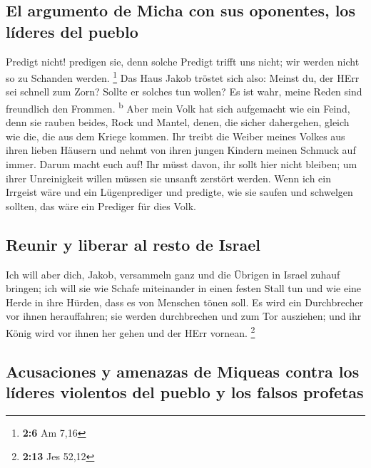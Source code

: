 \hypertarget{el-argumento-de-micha-con-sus-oponentes-los-luxedderes-del-pueblo}{%
\subsection{El argumento de Micha con sus oponentes, los líderes del
pueblo}\label{el-argumento-de-micha-con-sus-oponentes-los-luxedderes-del-pueblo}}

 Predigt nicht! predigen sie, denn solche Predigt trifft
uns nicht; wir werden nicht so zu Schanden werden. \footnote{\textbf{2:6}
  Am 7,16}  Das Haus Jakob tröstet sich also: Meinst du,
der HErr sei schnell zum Zorn? Sollte er solches tun wollen? Es ist
wahr, meine Reden sind freundlich den Frommen. \textsuperscript{b}
 Aber mein Volk hat sich aufgemacht wie ein Feind, denn
sie rauben beides, Rock und Mantel, denen, die sicher dahergehen, gleich
wie die, die aus dem Kriege kommen.  Ihr treibt die Weiber
meines Volkes aus ihren lieben Häusern und nehmt von ihren jungen
Kindern meinen Schmuck auf immer.  Darum macht euch auf!
Ihr müsst davon, ihr sollt hier nicht bleiben; um ihrer Unreinigkeit
willen müssen sie unsanft zerstört werden.  Wenn ich ein
Irrgeist wäre und ein Lügenprediger und predigte, wie sie saufen und
schwelgen sollten, das wäre ein Prediger für dies Volk.

\hypertarget{reunir-y-liberar-al-resto-de-israel}{%
\subsection{Reunir y liberar al resto de
Israel}\label{reunir-y-liberar-al-resto-de-israel}}

 Ich will aber dich, Jakob, versammeln ganz und die
Übrigen in Israel zuhauf bringen; ich will sie wie Schafe miteinander in
einen festen Stall tun und wie eine Herde in ihre Hürden, dass es von
Menschen tönen soll.  Es wird ein Durchbrecher vor ihnen
herauffahren; sie werden durchbrechen und zum Tor ausziehen; und ihr
König wird vor ihnen her gehen und der HErr vornean. \footnote{\textbf{2:13}
  Jes 52,12}

\hypertarget{acusaciones-y-amenazas-de-miqueas-contra-los-luxedderes-violentos-del-pueblo-y-los-falsos-profetas}{%
\subsection{Acusaciones y amenazas de Miqueas contra los líderes
violentos del pueblo y los falsos
profetas}\label{acusaciones-y-amenazas-de-miqueas-contra-los-luxedderes-violentos-del-pueblo-y-los-falsos-profetas}}

